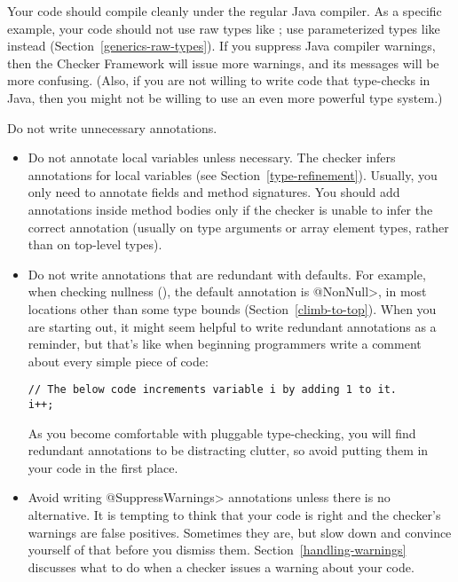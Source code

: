 Your code should compile cleanly under the regular Java compiler.  As a
specific example, your code should not use raw types like ; use
parameterized types like  instead
(Section~\ref{generics-raw-types}).  If you suppress Java compiler
warnings, then the Checker Framework will issue more warnings, and its
messages will be more confusing.  (Also, if you are not willing to write
code that type-checks in Java, then you might not be willing to use an even
more powerful type system.)

Do not write unnecessary annotations.
\begin{itemize}
\item
  Do not annotate local variables unless necessary.  The checker infers
  annotations for local variables (see Section~\ref{type-refinement}).
  Usually, you only need to annotate fields and method signatures.  You
  should add annotations inside method bodies only if the checker is unable
  to infer the correct annotation (usually on type arguments or array
  element types, rather than
  on top-level types).

\item
  Do not write annotations that are redundant with defaults.  For example,
  when checking nullness (), the default
  annotation is \<@NonNull>, in most locations other than some type bounds
  (Section~\ref{climb-to-top}).  When you are starting out, it might seem
  helpful to write redundant annotations as a reminder, but that's like
  when beginning programmers write a comment about every simple piece of
  code:

\begin{Verbatim}
// The below code increments variable i by adding 1 to it.
i++;
\end{Verbatim}

  As you become comfortable with pluggable type-checking, you will find
  redundant annotations to be distracting clutter, so avoid putting them in
  your code in the first place.

\item
  Avoid writing \<@SuppressWarnings> annotations unless there is no
  alternative.  It is tempting to think that your code is right and the
  checker's warnings are false positives.  Sometimes they are, but slow
  down and convince yourself of that before you dismiss them.
  Section~\ref{handling-warnings} discusses what to do when a checker
  issues a warning about your code.

\end{itemize}


